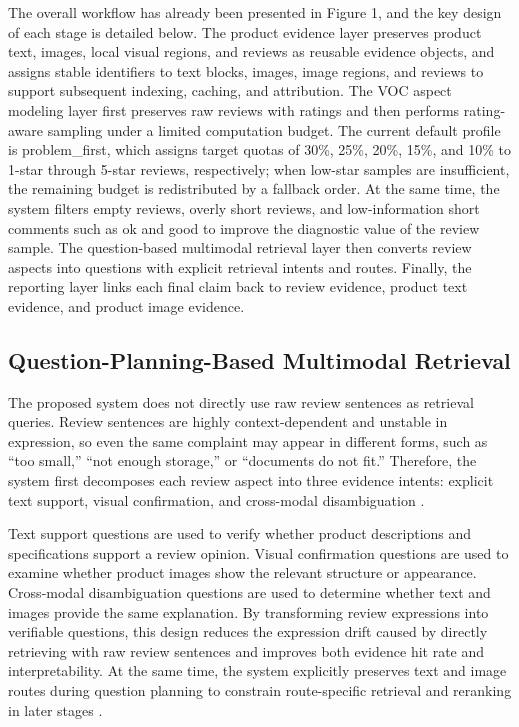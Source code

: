 \documentclass[11pt]{article}
\begin{document}
The overall workflow has already been presented in Figure 1, and the key design of each stage is detailed below. The product evidence layer preserves product text, images, local visual regions, and reviews as reusable evidence objects, and assigns stable identifiers to text blocks, images, image regions, and reviews to support subsequent indexing, caching, and attribution. The VOC aspect modeling layer first preserves raw reviews with ratings and then performs rating-aware sampling under a limited computation budget. The current default profile is problem\_first, which assigns target quotas of 30\%, 25\%, 20\%, 15\%, and 10\% to 1-star through 5-star reviews, respectively; when low-star samples are insufficient, the remaining budget is redistributed by a fallback order. At the same time, the system filters empty reviews, overly short reviews, and low-information short comments such as ok and good to improve the diagnostic value of the review sample. The question-based multimodal retrieval layer then converts review aspects into questions with explicit retrieval intents and routes. Finally, the reporting layer links each final claim back to review evidence, product text evidence, and product image evidence.

\subsection{Question-Planning-Based Multimodal Retrieval}

The proposed system does not directly use raw review sentences as retrieval queries. Review sentences are highly context-dependent and unstable in expression, so even the same complaint may appear in different forms, such as ``too small,'' ``not enough storage,'' or ``documents do not fit.'' Therefore, the system first decomposes each review aspect into three evidence intents: explicit text support, visual confirmation, and cross-modal disambiguation \citep{radford2021clip}.

Text support questions are used to verify whether product descriptions and specifications support a review opinion. Visual confirmation questions are used to examine whether product images show the relevant structure or appearance. Cross-modal disambiguation questions are used to determine whether text and images provide the same explanation. By transforming review expressions into verifiable questions, this design reduces the expression drift caused by directly retrieving with raw review sentences and improves both evidence hit rate and interpretability. At the same time, the system explicitly preserves text and image routes during question planning to constrain route-specific retrieval and reranking in later stages \citep{liu2024structuredOutputBenchmark}.
\end{document}
